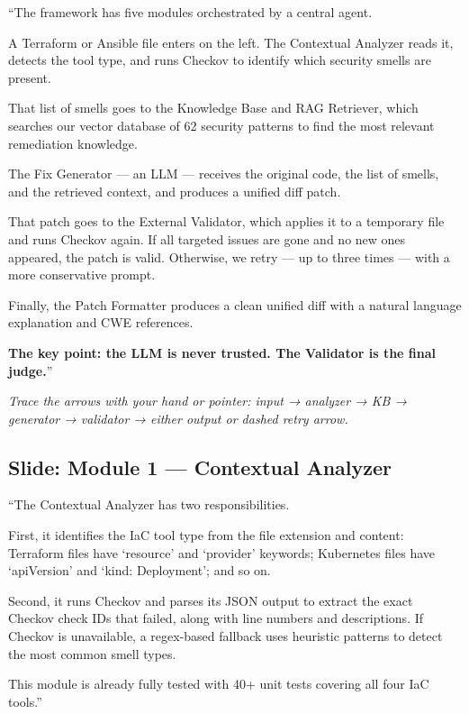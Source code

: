 \documentclass[12pt,a4paper]{article}
\newcommand{\cue}[1]{{\color{cuegreen}\textit{#1}}}
\begin{document}
\begin{saybox}
``The framework has five modules orchestrated by a central agent.

A Terraform or Ansible file enters on the left. The Contextual Analyzer reads it,
detects the tool type, and runs Checkov to identify which security smells are present.

That list of smells goes to the Knowledge Base and RAG Retriever,
which searches our vector database of 62 security patterns to find
the most relevant remediation knowledge.

The Fix Generator --- an LLM --- receives the original code,
the list of smells, and the retrieved context, and produces a unified diff patch.

That patch goes to the External Validator, which applies it to a temporary file
and runs Checkov again. If all targeted issues are gone and no new ones appeared,
the patch is valid. Otherwise, we retry --- up to three times --- with a more conservative prompt.

Finally, the Patch Formatter produces a clean unified diff
with a natural language explanation and CWE references.

\textbf{The key point: the LLM is never trusted. The Validator is the final judge.}''
\end{saybox}

\cue{Trace the arrows with your hand or pointer: input → analyzer → KB → generator → validator → either output or dashed retry arrow.}

\subsection{Slide: Module 1 --- Contextual Analyzer}

\begin{saybox}
``The Contextual Analyzer has two responsibilities.

First, it identifies the IaC tool type from the file extension and content:
Terraform files have `resource' and `provider' keywords;
Kubernetes files have `apiVersion' and `kind: Deployment'; and so on.

Second, it runs Checkov and parses its JSON output to extract the exact
Checkov check IDs that failed, along with line numbers and descriptions.
If Checkov is unavailable, a regex-based fallback uses heuristic patterns
to detect the most common smell types.

This module is already fully tested with 40+ unit tests covering all four IaC tools.''
\end{saybox}
\end{document}
